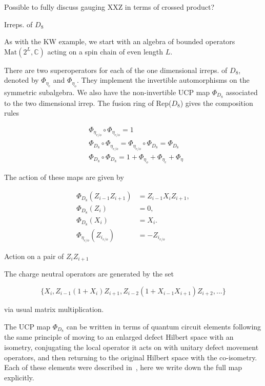 \documentclass{article}
\theoremstyle{definition}
\begin{document}
Possible to fully discuss gauging XXZ in terms of crossed product?

Irreps. of $D_8$
\color{black}



As with the KW example, we start with an algebra of bounded operators $\text{Mat}(2^L, \mathbb{C})$ acting on a spin chain of even length $L$.  

There are two superoperators for each of the one dimensional irreps. of $D_8$, denoted by $\Phi_{\eta_e}$ and $\Phi_{\eta_o}$.  They implement the invertible automorphisms on the symmetric subalgebra.  We also have the non-invertible UCP map $\Phi_{D_8}$ associated to the two dimensional irrep.  The fusion ring of Rep($D_8$) gives the composition rules


\begin{equation}
\begin{aligned}
    &\Phi_{\eta_{e/o}} \circ \Phi_{\eta_{e/o}} = 1\\
    &\Phi_{D_8} \circ \Phi_{\eta_{e/o}} = \Phi_{\eta_{e/o}} \circ
    \Phi_{D_8} = \Phi_{D_8}\\
    &\Phi_{D_8} \circ \Phi_{D_8} = 1 + \Phi_{\eta_{o}} + \Phi_{\eta_{e}} + \Phi_{\eta}
\end{aligned}
\end{equation}



The action of these maps are given by



\begin{equation}
\begin{aligned}
\Phi_{D_8}(Z_{i-1}Z_{i+1}) &= Z_{i-1}X_iZ_{i+1}, \\
\Phi_{D_8}(Z_i) &= 0, \\
\Phi_{D_8}(X_i) &= X_i.\\
\Phi_{\eta_{e/o}}(Z_{i_{e/o}}) &= -Z_{i_{e/o}}
\end{aligned}
\end{equation}


\color{brown}
Action on a pair of $Z_iZ_{i+1}$
\color{black}

The charge neutral operators are generated by the set

\begin{equation}
    \{X_i, Z_{i-1}(1+X_i)Z_{i+1},Z_{i-2}(1+X_{i-1}X_{i+1})Z_{i+2},...\}
\end{equation}

via usual matrix multiplication.

The UCP map $\Phi_{D_8}$ can be written in terms of quantum circuit elements following the same principle of moving to an enlarged defect Hilbert space with an isometry, conjugating the local operator it acts on with unitary defect movement operators, and then returning to the original Hilbert space with the co-isometry.  Each of these elements were described in~\cite{seifnashri2025gaugingnisonthelattice}, here we write down the full map explicitly.
\end{document}
